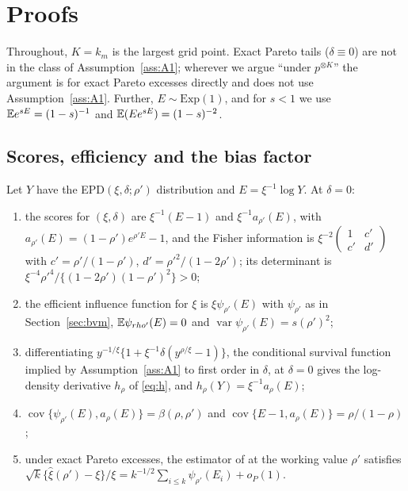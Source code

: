 \section{Proofs}\label{app:proofs}

Throughout, $K=k_m$ is the largest grid point. Exact Pareto tails ($\delta\equiv0$) are not
in the class of Assumption~\ref{ass:A1}; wherever we argue ``under $p^{\otimes K}$'' the argument is
for exact Pareto excesses directly and does not use Assumption~\ref{ass:A1}. Further, $E\sim\mathrm{Exp}(1)$, and for $s<1$ we use
$\mathbb{E} e^{sE}=(1-s)^{-1}$ and $\mathbb{E}(Ee^{sE})=(1-s)^{-2}$.

\subsection{Scores, efficiency and the bias factor}

\begin{lemma}\label{lem:scores}
Let $Y$ have the EPD$(\xi,\delta;\rho')$ distribution and $E=\xi^{-1}\log Y$. At $\delta=0$:
\begin{enumerate}
\item[(i)] the scores for $(\xi,\delta)$ are $\xi^{-1}(E-1)$ and $\xi^{-1}a_{\rho'}(E)$, with
$a_{\rho'}(E)=(1-\rho')e^{\rho'E}-1$, and the Fisher information is
$\xi^{-2}\begin{pmatrix}1&c'\\c'&d'\end{pmatrix}$ with $c'=\rho'/(1-\rho')$,
$d'=\rho'^2/(1-2\rho')$; its determinant is $\xi^{-4}\rho'^4/\{(1-2\rho')(1-\rho')^2\}>0$;
\item[(ii)] the efficient influence function for $\xi$ is $\xi\psi_{\rho'}(E)$ with $\psi_{\rho'}$
as in Section~\ref{sec:bvm}, $\mathbb{E}\psi_{rho'}(E)=0$ and $\operatorname{var}\psi_{\rho'}(E)=s(\rho')^2$;
\item[(iii)] differentiating $y^{-1/\xi}\{1+\xi^{-1}\delta(y^{\rho/\xi}-1)\}$, the conditional
survival function implied by Assumption~\ref{ass:A1} to first order in $\delta$, at
$\delta=0$ gives the log-density derivative $h_\rho$ of \eqref{eq:h}, and
$h_\rho(Y)=\xi^{-1}a_\rho(E)$;
\item[(iv)] $\operatorname{cov}\{\psi_{\rho'}(E),a_\rho(E)\}=\beta(\rho,\rho')$ and
$\operatorname{cov}\{E-1,a_\rho(E)\}=\rho/(1-\rho)$;
\item[(v)] under exact Pareto excesses, the estimator of \citet{bjs2009} at the working
value $\rho'$ satisfies $\sqrt{k}\{\hat\xi(\rho')-\xi\}/\xi=k^{-1/2}\sum_{i\le k}\psi_{\rho'}(E_i)+o_P(1)$.
\end{enumerate}
\end{lemma}

